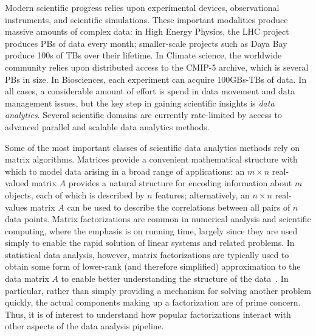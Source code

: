 Modern scientific progress relies upon experimental devices, observational instruments, and scientific simulations. These important modalities produce massive amounts of complex data: in High Energy Physics, the LHC project produces PBs of data every month; smaller-scale projects such as Daya Bay produce 100s of TBs over their lifetime. In Climate science, the worldwide community relies upon distributed access to the CMIP-5 archive, which is several PBs in size. In  Biosciences, each experiment can acquire 100GBs-TBs of data. In all cases, a considerable amount of effort is spend in data movement and data management issues, but the key step in gaining scientific insights is \emph{data analytics}. Several scientific domains are currently rate-limited by access to advanced parallel and scalable data analytics methods. 

Some of the most important classes of scientific data analytics methods rely on matrix algorithms. 
Matrices provide a convenient mathematical structure with which to model data arising in a broad range of applications: an $m \times n$ real-valued matrix $A$ provides a natural structure for encoding information about $m$ objects, each of which is described by $n$ features; alternatively, an $n \times n$ real-values matrix $A$ can be used to describe the correlations between all pairs of $n$ data points. 
Matrix factorizations are common in numerical analysis and scientific computing, where the emphasis is on running time, largely since they are used simply to enable the rapid solution of linear systems and related problems.
In statistical data analysis, however, matrix factorizations are typically used to obtain some form of lower-rank (and therefore simplified) approximation to the data matrix $A$ to enable better understanding the structure of the data~\cite{HMH00}.
In particular, rather than simply providing a mechanism for solving another problem quickly, the actual components making up a factorization are of prime concern.
Thus, it is of interest to understand how popular factorizations interact with other aspects of the data analysis pipeline.


